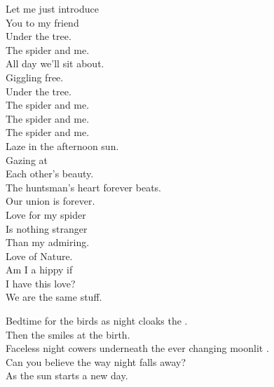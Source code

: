 




Let me just introduce \\
You to my friend \\
Under the tree. \\
The spider and me. \\
All day we'll sit about. \\
Giggling free. \\
Under the tree. \\
The spider and me. \\

The spider and me. \\
The spider and me. \\

Laze in the afternoon sun. \\
Gazing at \\
Each other's beauty. \\
The huntsman's heart forever beats. \\
Our union is forever. \\

Love for my spider \\
Is nothing stranger \\
Than my admiring. \\
Love of Nature. \\
Am I a hippy if \\
I have this love? \\
We are the same stuff. \\








Bedtime for the birds as night cloaks the . \\
Then the  smiles at the  birth. \\
Faceless night cowers underneath the ever changing moonlit . \\
Can you believe the way night falls away? \\
As the sun starts a new day. \\

